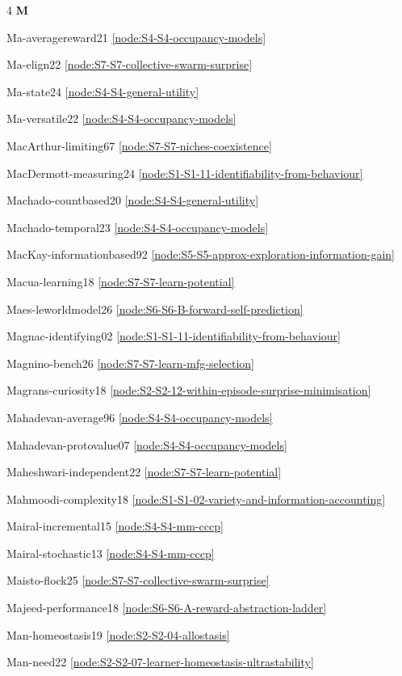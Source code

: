 \documentclass[10pt]{article}
\begin{document}
{\begin{multicols}{4}
\smallskip\textbf{M}\par
Ma-averagereward21 \hfill \ref{node:S4-S4-occupancy-models}\par
Ma-elign22 \hfill \ref{node:S7-S7-collective-swarm-surprise}\par
Ma-state24 \hfill \ref{node:S4-S4-general-utility}\par
Ma-versatile22 \hfill \ref{node:S4-S4-occupancy-models}\par
MacArthur-limiting67 \hfill \ref{node:S7-S7-niches-coexistence}\par
MacDermott-measuring24 \hfill \ref{node:S1-S1-11-identifiability-from-behaviour}\par
Machado-countbased20 \hfill \ref{node:S4-S4-general-utility}\par
Machado-temporal23 \hfill \ref{node:S4-S4-occupancy-models}\par
MacKay-informationbased92 \hfill \ref{node:S5-S5-approx-exploration-information-gain}\par
Macua-learning18 \hfill \ref{node:S7-S7-learn-potential}\par
Maes-leworldmodel26 \hfill \ref{node:S6-S6-B-forward-self-prediction}\par
Magnac-identifying02 \hfill \ref{node:S1-S1-11-identifiability-from-behaviour}\par
Magnino-bench26 \hfill \ref{node:S7-S7-learn-mfg-selection}\par
Magrans-curiosity18 \hfill \ref{node:S2-S2-12-within-episode-surprise-minimisation}\par
Mahadevan-average96 \hfill \ref{node:S4-S4-occupancy-models}\par
Mahadevan-protovalue07 \hfill \ref{node:S4-S4-occupancy-models}\par
Maheshwari-independent22 \hfill \ref{node:S7-S7-learn-potential}\par
Mahmoodi-complexity18 \hfill \ref{node:S1-S1-02-variety-and-information-accounting}\par
Mairal-incremental15 \hfill \ref{node:S4-S4-mm-cccp}\par
Mairal-stochastic13 \hfill \ref{node:S4-S4-mm-cccp}\par
Maisto-flock25 \hfill \ref{node:S7-S7-collective-swarm-surprise}\par
Majeed-performance18 \hfill \ref{node:S6-S6-A-reward-abstraction-ladder}\par
Man-homeostasis19 \hfill \ref{node:S2-S2-04-allostasis}\par
Man-need22 \hfill \ref{node:S2-S2-07-learner-homeostasis-ultrastability}\par

\end{multicols}}
\end{document}

